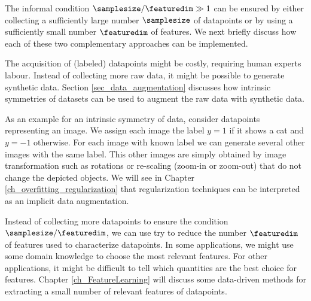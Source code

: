 \documentclass[12pt]{report}
\newcommand{\featurelen}{\featuredim}
\begin{document}
The informal condition $\samplesize/\featurelen \gg 1$ can be ensured 
by either collecting a sufficiently large number $\samplesize$ of datapoints 
or by using a sufficiently small number $\featurelen$ of features. We next briefly  
discuss how each of these two complementary approaches can be implemented. 

The acquisition of (labeled) datapoints might be costly, requiring human 
experts labour. Instead of collecting more raw data, it might 
be possible to generate synthetic data. Section \ref{sec_data_augmentation} 
discusses how intrinsic symmetries of datasets can be used to augment 
the raw data with synthetic data. 

As an example for an intrinsic symmetry of data, consider datapoints 
representing an image. We assign each image the label $y=1$ if it shows 
a cat and $y=-1$ otherwise. For each image with known label we can 
generate several other images with the same label. This other images 
are simply obtained by image transformation such as rotations or 
re-scaling (zoom-in or zoom-out) that do not change the depicted 
objects. We will see in Chapter \ref{ch_overfitting_regularization} 
that regularization techniques can be interpreted as an implicit 
data augmentation.  

Instead of collecting more datapoints to ensure the condition $\samplesize/\featurelen$, 
we can use try to reduce the number $\featurelen$ of features used to 
characterize datapoints. In some applications, we might use some domain 
knowledge to choose the most relevant features. For other applications, 
it might be difficult to tell which quantities are the best choice for features. 
Chapter \ref{ch_FeatureLearning} will discuss some data-driven methods 
for extracting a small number of relevant features of datapoints. 

\end{document}
